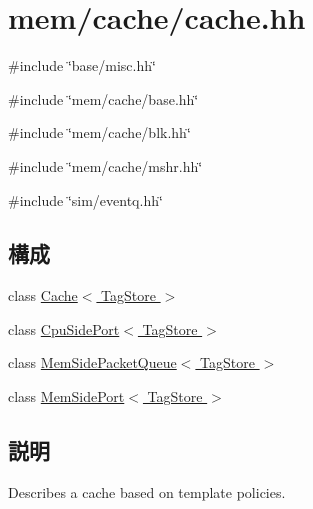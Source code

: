 \hypertarget{cache_8hh}{
\section{mem/cache/cache.hh}
\label{cache_8hh}
}
{\ttfamily \#include \char`\"{}base/misc.hh\char`\"{}}\par
{\ttfamily \#include \char`\"{}mem/cache/base.hh\char`\"{}}\par
{\ttfamily \#include \char`\"{}mem/cache/blk.hh\char`\"{}}\par
{\ttfamily \#include \char`\"{}mem/cache/mshr.hh\char`\"{}}\par
{\ttfamily \#include \char`\"{}sim/eventq.hh\char`\"{}}\par
\subsection*{構成}
\begin{DoxyCompactItemize}
\item 
class \hyperlink{classCache}{Cache$<$ TagStore $>$}
\item 
class \hyperlink{classCache_1_1CpuSidePort}{CpuSidePort$<$ TagStore $>$}
\item 
class \hyperlink{classCache_1_1MemSidePacketQueue}{MemSidePacketQueue$<$ TagStore $>$}
\item 
class \hyperlink{classCache_1_1MemSidePort}{MemSidePort$<$ TagStore $>$}
\end{DoxyCompactItemize}


\subsection{説明}
Describes a cache based on template policies. 
